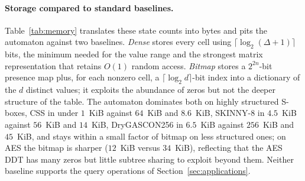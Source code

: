 \documentclass[runningheads]{llncs}
\begin{document}
\paragraph{Storage compared to standard baselines.}
Table~\ref{tab:memory} translates these state counts into bytes and pits the
automaton against two baselines. \emph{Dense} stores every cell using
$\lceil\log_2(\Delta+1)\rceil$ bits, the minimum needed for the value range and
the strongest matrix representation that retains $O(1)$ random access.
\emph{Bitmap} stores a $2^{2n}$-bit presence map plus, for each nonzero cell, a
$\lceil\log_2 d\rceil$-bit index into a dictionary of the $d$ distinct values;
it exploits the abundance of zeros but not the deeper structure of the table.
The automaton dominates both on highly structured S-boxes, CSS in under
$1$~KiB against $64$~KiB and $8.6$~KiB, SKINNY-8 in $4.5$~KiB against $56$~KiB
and $14$~KiB, DryGASCON256 in $6.5$~KiB against $256$~KiB and $45$~KiB, and
stays within a small factor of bitmap on less structured ones; on AES the
bitmap is sharper ($12$~KiB versus $34$~KiB), reflecting that the AES DDT has
many zeros but little subtree sharing to exploit beyond them. Neither baseline
supports the query operations of Section~\ref{sec:applications}.
\end{document}
